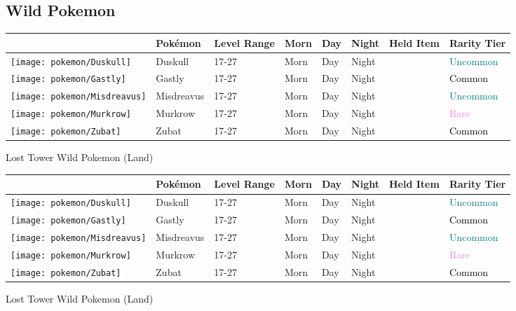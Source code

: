 \subsection{Wild Pokemon}%
\label{subsec:WildPokemon}%
\begin{longtable}{||l l l l l l l l||}%
\hline%
&Pokémon&Level Range&Morn&Day&Night&Held Item&Rarity Tier\\%
\hline%
\endhead%
\hline%
\texttt{[image: pokemon/Duskull]}&Duskull&17{-}27&Morn&Day&Night&&\textcolor{teal}{%
Uncommon%
}\\%
\hline%
\texttt{[image: pokemon/Gastly]}&Gastly&17{-}27&Morn&Day&Night&&\textcolor{black}{%
Common%
}\\%
\hline%
\texttt{[image: pokemon/Misdreavus]}&Misdreavus&17{-}27&Morn&Day&Night&&\textcolor{teal}{%
Uncommon%
}\\%
\hline%
\texttt{[image: pokemon/Murkrow]}&Murkrow&17{-}27&Morn&Day&Night&&\textcolor{violet}{%
Rare%
}\\%
\hline%
\texttt{[image: pokemon/Zubat]}&Zubat&17{-}27&Morn&Day&Night&&\textcolor{black}{%
Common%
}\\%
\hline%
\end{longtable}%
\caption{Lost Tower Wild Pokemon (Land)}%
\begin{longtable}{||l l l l l l l l||}%
\hline%
&Pokémon&Level Range&Morn&Day&Night&Held Item&Rarity Tier\\%
\hline%
\endhead%
\hline%
\texttt{[image: pokemon/Duskull]}&Duskull&17{-}27&Morn&Day&Night&&\textcolor{teal}{%
Uncommon%
}\\%
\hline%
\texttt{[image: pokemon/Gastly]}&Gastly&17{-}27&Morn&Day&Night&&\textcolor{black}{%
Common%
}\\%
\hline%
\texttt{[image: pokemon/Misdreavus]}&Misdreavus&17{-}27&Morn&Day&Night&&\textcolor{teal}{%
Uncommon%
}\\%
\hline%
\texttt{[image: pokemon/Murkrow]}&Murkrow&17{-}27&Morn&Day&Night&&\textcolor{violet}{%
Rare%
}\\%
\hline%
\texttt{[image: pokemon/Zubat]}&Zubat&17{-}27&Morn&Day&Night&&\textcolor{black}{%
Common%
}\\%
\hline%
\end{longtable}%
\caption{Lost Tower Wild Pokemon (Land)}%
